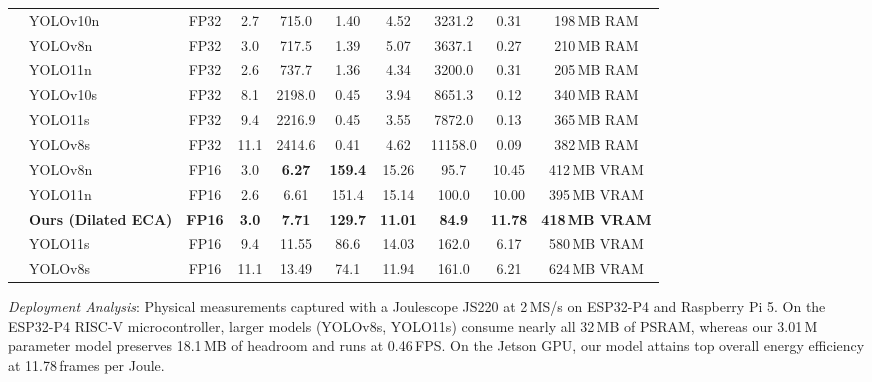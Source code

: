 \documentclass[journal,twoside,web]{ieeecolor}
\begin{document}
\begin{table}[t]
{\begin{tabular}{llcccccccc}
 & YOLOv10n & FP32 & 2.7 & 715.0 & 1.40 & 4.52 & 3231.2 & 0.31 & 198\,MB RAM \\
 & YOLOv8n & FP32 & 3.0 & 717.5 & 1.39 & 5.07 & 3637.1 & 0.27 & 210\,MB RAM \\
 & YOLO11n & FP32 & 2.6 & 737.7 & 1.36 & 4.34 & 3200.0 & 0.31 & 205\,MB RAM \\
 & YOLOv10s & FP32 & 8.1 & 2198.0 & 0.45 & 3.94 & 8651.3 & 0.12 & 340\,MB RAM \\
 & YOLO11s & FP32 & 9.4 & 2216.9 & 0.45 & 3.55 & 7872.0 & 0.13 & 365\,MB RAM \\
 & YOLOv8s & FP32 & 11.1 & 2414.6 & 0.41 & 4.62 & 11158.0 & 0.09 & 382\,MB RAM \\
\midrule
{}
 & YOLOv8n & FP16 & 3.0 & \textbf{6.27} & \textbf{159.4} & 15.26 & 95.7 & 10.45 & 412\,MB VRAM \\
 & YOLO11n & FP16 & 2.6 & 6.61 & 151.4 & 15.14 & 100.0 & 10.00 & 395\,MB VRAM \\
 & \textbf{Ours (Dilated ECA)} & \textbf{FP16} & \textbf{3.0} & \textbf{7.71} & \textbf{129.7} & \textbf{11.01} & \textbf{84.9} & \textbf{11.78} & \textbf{418\,MB VRAM} \\
 & YOLO11s & FP16 & 9.4 & 11.55 & 86.6 & 14.03 & 162.0 & 6.17 & 580\,MB VRAM \\
 & YOLOv8s & FP16 & 11.1 & 13.49 & 74.1 & 11.94 & 161.0 & 6.21 & 624\,MB VRAM \\
\bottomrule
\end{tabular}%
}
\vspace{1ex}
{\raggedright \footnotesize \textit{Deployment Analysis}: Physical measurements captured with a Joulescope JS220 at 2\,MS/s on ESP32-P4 and Raspberry Pi 5. On the ESP32-P4 RISC-V microcontroller, larger models (YOLOv8s, YOLO11s) consume nearly all 32\,MB of PSRAM, whereas our 3.01\,M parameter model preserves 18.1\,MB of headroom and runs at 0.46\,FPS. On the Jetson GPU, our model attains top overall energy efficiency at 11.78\,frames per Joule.\par}
\end{table}
\end{document}
